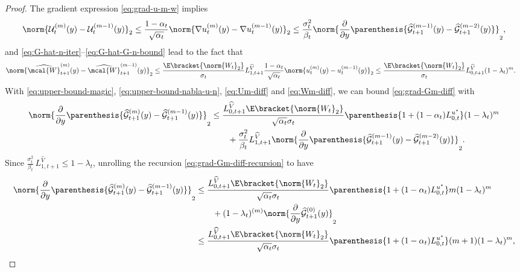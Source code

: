 \documentclass{article}
\begin{document}
\begin{proof}
The gradient expression \eqref{eq:grad-u-m-w} implies
\begin{align}
    \norm{\mathcal{U}^{(m)}_t(y) - \mathcal{U}^{(m-1)}_t(y)}_2 \leq \frac{1 - \alpha_t}{\sqrt{\alpha_t}}\norm{\nabla u_t^{(m)}(y) -\nabla u_t^{(m-1)}(y)}_2 \leq \frac{\sigma_t^2}{\beta_t}\norm{\frac{\partial}{\partial y} \parenthesis{\widehat{\mathcal{G}}_{t+1}^{(m-1)}(y)-\widehat{\mathcal{G}}_{t+1}^{(m-2)}(y)}}_2, \label{eq:Um-diff}
\end{align}
and \eqref{eq:G-hat-n-iter}--\eqref{eq:G-hat-G-n-bound} lead to the fact that
\begin{align}
    \norm{\widehat{\mcal{W}}_{t+1}^{{(m)}}(y) - \widehat{\mcal{W}}_{t+1}^{{(m-1)}}(y)}_2 & \leq \frac{\E\bracket{\norm{W_{t}}_2}}{\sigma_{t}}L_{1, t+1}^{\widehat{V}}\frac{1 - \alpha_{t}}{\sqrt{\alpha_{t}}}\norm{u_t^{(m)}(y) - u_t^{(m-1)}(y)}_2  \leq \frac{\E\bracket{\norm{W_{t}}_2}}{\sigma_{t}}L_{0, t+1}^{\widehat{V}}(1 - \lambda_t)^{m}. \label{eq:Wm-diff}
\end{align}
With \eqref{eq:upper-bound-magic}, \eqref{eq:upper-bound-nabla-u-n}, \eqref{eq:Um-diff} and \eqref{eq:Wm-diff}, we can bound \eqref{eq:grad-Gm-diff} with
\begin{align}
    \norm{\frac{\partial}{\partial y} \parenthesis{\widehat{\mathcal{G}}_{t+1}^{(m)}(y)-\widehat{\mathcal{G}}_{t+1}^{(m-1)}(y)}}_2 & \leq \frac{L_{0, t+1}^{\widehat{V}}\E\bracket{\norm{W_{t}}_2}}{\sqrt{\alpha_{t}}\sigma_{t}}\parenthesis{1 + (1 - \alpha_{t})L_{0,t}^{u^{*}}}(1 - \lambda_t)^m \nonumber \\ & \qquad + \frac{\sigma_t^2}{\beta_t}L_{1, t+1}^{\widehat{V}} \norm{\frac{\partial}{\partial y} \parenthesis{\widehat{\mathcal{G}}_{t+1}^{(m-1)}(y)-\widehat{\mathcal{G}}_{t+1}^{(m-2)}(y)}}_2. \label{eq:grad-Gm-diff-recursion}
\end{align}
Since $\frac{\sigma_{t}^{2}}{\beta_{t}}\,L_{1, t+1}^{\widehat{V}} \leq 1 - \lambda_t$, unrolling the recursion \eqref{eq:grad-Gm-diff-recursion} to have
\begin{align}
    \norm{\frac{\partial}{\partial y} \parenthesis{\widehat{\mathcal{G}}_{t+1}^{(m)}(y)-\widehat{\mathcal{G}}_{t+1}^{(m-1)}(y)}}_2 & \leq \frac{L_{0, t+1}^{\widehat{V}}\E\bracket{\norm{W_{t}}_2}}{\sqrt{\alpha_{t}}\sigma_{t}}\parenthesis{1 + (1 - \alpha_{t})L_{0,t}^{u^{*}}}m(1 - \lambda_t)^m \nonumber \\ & \qquad + (1 - \lambda_t)^{(m)}\norm{\frac{\partial}{\partial y} \widehat{\mathcal{G}}_{t+1}^{(0)}(y)}_2 \nonumber \\ & \leq \frac{L_{0, t+1}^{\widehat{V}}\E\bracket{\norm{W_{t}}_2}}{\sqrt{\alpha_{t}}\sigma_{t}}\parenthesis{1 + (1 - \alpha_{t})L_{0,t}^{u^{*}}}(m+1)(1 - \lambda_t)^m, \label{eq:grad-g-diff-m}

\end{align}
\end{proof}
\end{document}
